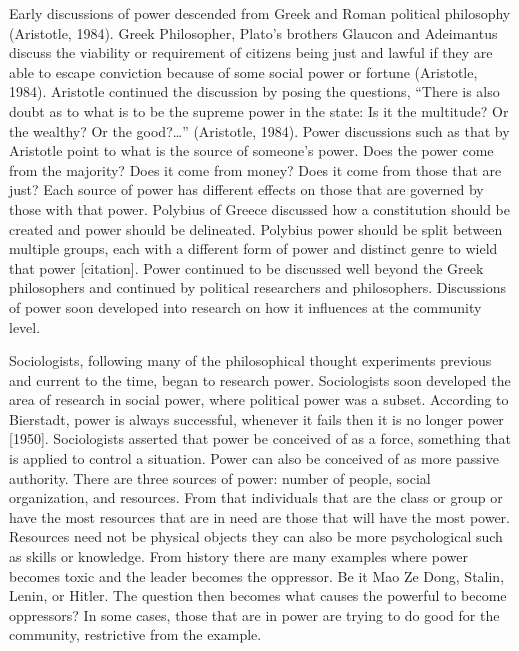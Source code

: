 \documentclass[
  donotrepeattitle,doc, 12pt, a4paper,floatsintext]{apa7}
\begin{document}
Early discussions of power descended from Greek and Roman political philosophy (Aristotle, 1984). Greek Philosopher, Plato's brothers Glaucon and Adeimantus discuss the viability or requirement of citizens being just and lawful if they are able to escape conviction because of some social power or fortune (Aristotle, 1984). Aristotle continued the discussion by posing the questions, ``There is also doubt as to what is to be the supreme power in the state: Is it the multitude? Or the wealthy? Or the good?\ldots{}'' (Aristotle, 1984). Power discussions such as that by Aristotle point to what is the source of someone's power. Does the power come from the majority? Does it come from money? Does it come from those that are just? Each source of power has different effects on those that are governed by those with that power. Polybius of Greece discussed how a constitution should be created and power should be delineated. Polybius power should be split between multiple groups, each with a different form of power and distinct genre to wield that power {[}citation{]}. Power continued to be discussed well beyond the Greek philosophers and continued by political researchers and philosophers. Discussions of power soon developed into research on how it influences at the community level.

Sociologists, following many of the philosophical thought experiments previous and current to the time, began to research power. Sociologists soon developed the area of research in social power, where political power was a subset. According to Bierstadt, power is always successful, whenever it fails then it is no longer power {[}1950{]}. Sociologists asserted that power be conceived of as a force, something that is applied to control a situation. Power can also be conceived of as more passive authority. There are three sources of power: number of people, social organization, and resources. From that individuals that are the class or group or have the most resources that are in need are those that will have the most power. Resources need not be physical objects they can also be more psychological such as skills or knowledge. From history there are many examples where power becomes toxic and the leader becomes the oppressor. Be it Mao Ze Dong, Stalin, Lenin, or Hitler. The question then becomes what causes the powerful to become oppressors? In some cases, those that are in power are trying to do good for the community, restrictive from the example.
\end{document}
